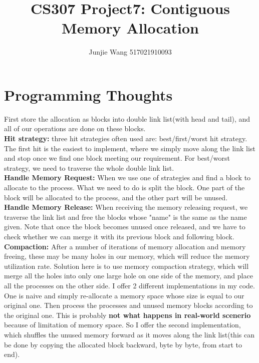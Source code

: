 \documentclass[12pt]{extarticle}
\title{CS307 Project7: Contiguous Memory Allocation}
\author{Junjie Wang 517021910093}
\newcommand{\<}{\langle}
\renewcommand{\>}{\rangle}
\theoremstyle{definition}
\begin{document}
	\maketitle
	\section{Programming Thoughts}
	First store the allocation as blocks into double link list(with head and tail), and all of our operations are done on these blocks. \\
	\textbf{Hit strategy:} three hit strategies often used are: best/first/worst hit strategy. The first hit is the easiest to implement, where we simply move along the link list and stop once we find one block meeting our requirement. For best/worst strategy, we need to traverse the whole double link list. \\
	\textbf{Handle Memory Request:} When we use one of strategies and find a block to allocate to the process. What we need to do is split the block. One part of the block will be allocated to the process, and the other part will be unused. \\
	\textbf{Handle Memory Release:} When receiving the memory releasing request, we traverse the link list and free the blocks whose "name" is the same as the name given. Note that once the block becomes unused once released, and we have to check whether we can merge it with its previous block and following block. \\
	\textbf{Compaction:} After a number of iterations of memory allocation and memory freeing, these may be many holes in our memory, which will reduce the memory utilization rate. Solution here is to use memory compaction strategy, which will merge all the holes into only one large hole on one side of the memory, and place all the processes on the other side. I offer 2 different implementations in my code. One is naive and simply re-allocate a memory space whose size is equal to our original one. Then process the processes and unused memory blocks according to the original one. This is probably \textbf{not what happens in real-world scenerio} because of limitation of memory space. So I offer the second implementation, which shuffles the unused memory forward as it moves along the link list(this can be done by copying the allocated block backward, byte by byte, from start to end). 
\end{document}
